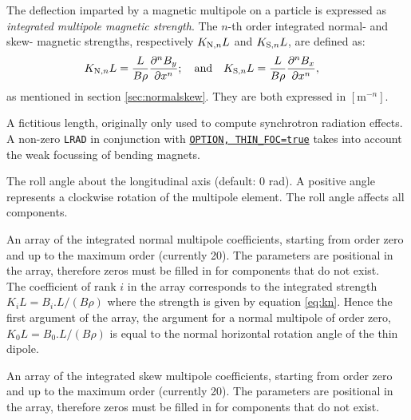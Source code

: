 The deflection imparted by a
magnetic multipole on a particle is expressed as \textit{integrated
  multipole magnetic strength}.
The $n$-th order integrated normal- and skew- magnetic strengths, respectively $K_{\textnormal{N},n}L$  and $K_{\textnormal{S},n}L$, are defined as:
\begin{equation}
\begin{aligned}K_{\textnormal{N},n}L & =\frac{L}{B\rho}\frac{\partial^{n}B_{y}}{\partial x^{n}};\quad\text{and}\quad K_{\textnormal{S,}n}L=\frac{L}{B\rho}\frac{\partial^{n}B_{x}}{\partial x^{n}},\end{aligned}
\label{eq:STRENGHT-1}
\end{equation}
  as mentioned in section \ref{sec:normalskew}.
They are both expressed in $[\mathrm{m}^{-n}]$.
\begin{madlist}
     A fictitious length, originally only used to
      compute synchrotron radiation effects. \\
      A non-zero \texttt{LRAD} in conjunction with
      \hyperref[sec:option]{\texttt{OPTION, THIN\_FOC=true}}
      takes into account the weak focussing of bending magnets.

     The roll angle about the longitudinal axis (default: 0
      rad). A positive angle represents a clockwise rotation of the
      multipole element. The roll angle affects all components.

     An array of the integrated normal multipole coefficients,
      starting from order zero and up to the maximum order (currently 20).
      The parameters are positional in the array, therefore
      zeros must be filled in for components that do not exist. \\
      The coefficient of rank $i$ in the array corresponds to the integrated
      strength $K_i L = B_i . L / (B\rho)$ where the strength is given by
      equation \ref{eq:kn}.
      Hence the first argument of the array, the argument for a normal
      multipole of order zero, $K_0 L = B_0 . L / (B\rho)$ is equal to
      the normal horizontal rotation angle of the thin dipole.

     An array of the integrated skew multipole coefficients,
     starting from order zero and up to the maximum order (currently 20). The
     parameters are positional in the array, therefore zeros must be
     filled in for components that do not exist.

\end{madlist}


